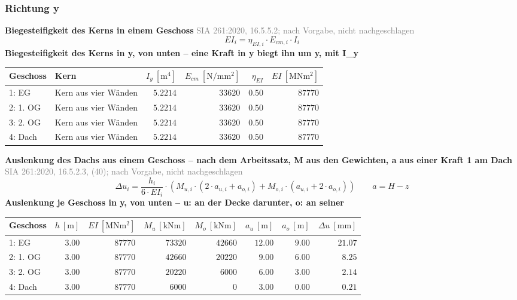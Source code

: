 \documentclass[11pt,a4paper]{article}
\newcommand{\normref}[1]{{\small\textcolor{gray}{#1}}}
\begin{document}
\subsubsection{Richtung y}
\noindent\textbf{Biegesteifigkeit des Kerns in einem Geschoss} \hfill \normref{SIA 261:2020, 16.5.5.2; nach Vorgabe, nicht nachgeschlagen}
\begin{equation*}
EI_i = \eta_{EI,i} \cdot E_{cm,i} \cdot I_i
\end{equation*}
\noindent\textbf{Biegesteifigkeit des Kerns in y, von unten – eine Kraft in y biegt ihn um y, mit I\_y}
\begin{longtable}{llrrrr}
\hline
Geschoss & Kern & $I_y\ [\mathrm{m}^4]$ & $E_{cm}\ [\mathrm{N/mm^2}]$ & $\eta_{EI}$ & $EI\ [\mathrm{MNm^2}]$ \\
\hline
\endhead
1: EG & Kern aus vier Wänden & $5.2214$ & $33620$ & $0.50$ & $87770$ \\
2: 1. OG & Kern aus vier Wänden & $5.2214$ & $33620$ & $0.50$ & $87770$ \\
3: 2. OG & Kern aus vier Wänden & $5.2214$ & $33620$ & $0.50$ & $87770$ \\
4: Dach & Kern aus vier Wänden & $5.2214$ & $33620$ & $0.50$ & $87770$ \\
\hline
\end{longtable}
\noindent\textbf{Auslenkung des Dachs aus einem Geschoss – nach dem Arbeitssatz, M aus den Gewichten, a aus einer Kraft 1 am Dach} \hfill \normref{SIA 261:2020, 16.5.2.3, (40); nach Vorgabe, nicht nachgeschlagen}
\begin{equation*}
\Delta u_i = \frac{h_i}{6 \cdot EI_i} \cdot \left(M_{u,i} \cdot (2 \cdot a_{u,i} + a_{o,i}) + M_{o,i} \cdot (a_{u,i} + 2 \cdot a_{o,i})\right) \qquad a = H - z
\end{equation*}
\noindent\textbf{Auslenkung je Geschoss in y, von unten – u: an der Decke darunter, o: an seiner}
\begin{longtable}{lrrrrrrr}
\hline
Geschoss & $h\ [\mathrm{m}]$ & $EI\ [\mathrm{MNm^2}]$ & $M_u\ [\mathrm{kNm}]$ & $M_o\ [\mathrm{kNm}]$ & $a_u\ [\mathrm{m}]$ & $a_o\ [\mathrm{m}]$ & $\Delta u\ [\mathrm{mm}]$ \\
\hline
\endhead
1: EG & $3.00$ & $87770$ & $73320$ & $42660$ & $12.00$ & $9.00$ & $21.07$ \\
2: 1. OG & $3.00$ & $87770$ & $42660$ & $20220$ & $9.00$ & $6.00$ & $8.25$ \\
3: 2. OG & $3.00$ & $87770$ & $20220$ & $6000$ & $6.00$ & $3.00$ & $2.14$ \\
4: Dach & $3.00$ & $87770$ & $6000$ & $0$ & $3.00$ & $0.00$ & $0.21$ \\
\hline
\end{longtable}
\end{document}
